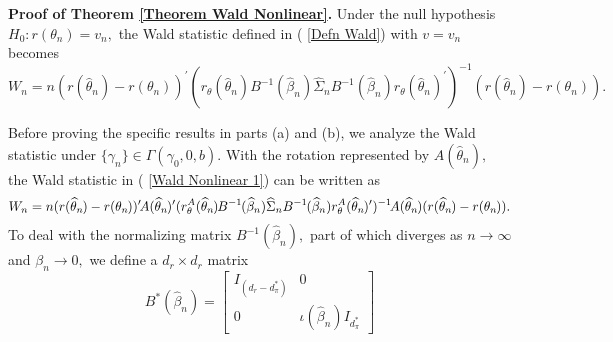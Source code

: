 \documentclass[12pt,titlepage,final,oneside,letterpaper]{article}
\begin{document}
\noindent \textbf{Proof of Theorem \ref{Theorem Wald Nonlinear}.} Under the
null hypothesis $H_{0}:r(\theta _{n})=v_{n},$ the Wald statistic defined in (%
\ref{Defn Wald}) with $v=v_{n}$ becomes%
\begin{equation}
W_{n}=n(r(\widehat{\theta }_{n})-r(\theta _{n}))^{\prime }(r_{\theta }(%
\widehat{\theta }_{n})B^{-1}(\widehat{\beta }_{n})\widehat{\Sigma }%
_{n}B^{-1}(\widehat{\beta }_{n})r_{\theta }(\widehat{\theta }_{n})^{\prime
})^{-1}(r(\widehat{\theta }_{n})-r(\theta _{n})).  \label{Wald Nonlinear 1}
\end{equation}

Before proving the specific results in parts (a) and (b), we analyze the
Wald statistic under $\{\gamma _{n}\}\in \Gamma (\gamma _{0},0,b).$ With the
rotation represented by $A(\widehat{\theta }_{n}),$ the Wald statistic in (%
\ref{Wald Nonlinear 1}) can be written as%
\begin{equation}
W_{n}=n(r(\widehat{\theta }_{n}\hspace{-0.01in})-r(\theta _{n}\hspace{-0.01in%
}))^{\prime }\hspace{-0.02in}A(\widehat{\theta }_{n}\hspace{-0.01in}%
)^{\prime }(r_{\theta }^{A}(\widehat{\theta }_{n}\hspace{-0.01in})\hspace{%
-0.01in}B^{-1\hspace{-0.01in}}(\widehat{\beta }_{n})\widehat{\Sigma }%
_{n}B^{-1}\hspace{-0.01in}(\widehat{\beta }_{n})r_{\theta }^{A}(\widehat{%
\theta }_{n}\hspace{-0.01in})^{\prime })^{-1}\hspace{-0.02in}A(\widehat{%
\theta }_{n}\hspace{-0.01in})(r(\widehat{\theta }_{n}\hspace{-0.01in}%
)-r(\theta _{n}\hspace{-0.01in})).  \label{Wald Nonlinear 2}
\end{equation}%
To deal with the normalizing matrix $B^{-1}(\widehat{\beta }_{n}),$ part of
which diverges as $n\rightarrow \infty $ and $\beta _{n}\rightarrow 0,$ we
define a $d_{r}\times d_{r}$ matrix 
\begin{equation}
B^{\ast }(\widehat{\beta }_{n})=\left[ 
\begin{array}{cc}
I_{(d_{r}-d_{\pi }^{\ast })} & 0 \\ 
0 & \iota (\widehat{\beta }_{n})I_{d_{\pi }^{\ast }}%
\end{array}%
\right]  \label{B_star}
\end{equation}%
\end{document}
